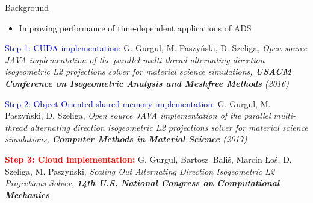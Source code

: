 \documentclass[c]{beamer}
\newcommand{\inred}[1]{\textcolor{red}{#1}}
\newcommand{\inblue}[1]{\textcolor{blue}{#1}}
\begin{document}
\begin{frame}{Background}

\begin{itemize}
  \item Improving performance of time-dependent applications of ADS
\end{itemize}

\inblue{Step 1: CUDA implementation: }\break
G. Gurgul, M. Paszy\'{n}ski, D. Szeliga, 
\it{Open source JAVA implementation of the parallel multi-thread alternating direction isogeometric L2 projections solver for material science simulations}, {\bf USACM Conference on Isogeometric Analysis and Meshfree Methods} (2016) 

\vspace{1mm}
\inblue{Step 2: Object-Oriented shared memory implementation: }\break
G. Gurgul, M. Paszy\'{n}ski, D. Szeliga, 
\it{Open source JAVA implementation of the parallel multi-thread alternating direction isogeometric L2 projections solver for material science simulations}, {\bf Computer Methods in Material Science} (2017) 

\vspace{1mm}
\inred{\bf Step 3: Cloud implementation: }\break
G. Gurgul, Bartosz~Bali\'{s},  Marcin \L{}o\'{s}, D. Szeliga, M. Paszy\'{n}ski, \it{Scaling Out Alternating Direction Isogeometric L2 Projections Solver}, {\bf 14th U.S. National Congress on Computational Mechanics}


\end{frame}





\end{document}
